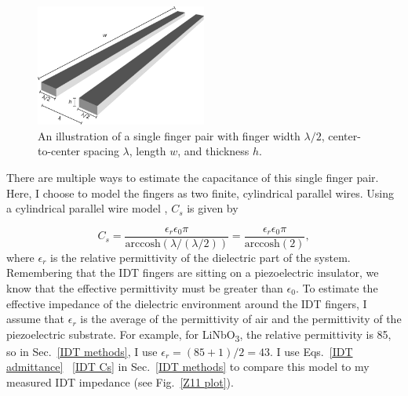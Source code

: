 \documentclass[double,12pt,1in,seploa]{beavtex}
\begin{document}
\begin{figure}
    \includegraphics[width = 0.5\textwidth]{IDT capacitance toy model_3d.pdf}
    \caption{An illustration of a single finger pair with finger width $\lambda/2$, center-to-center spacing $\lambda$, length $w$, and thickness $h$.}
    \label{IDT capacitance toy model}
\end{figure}
There are multiple ways to estimate the capacitance of this single finger pair. Here, I choose to model the fingers as two finite, cylindrical parallel wires. Using a cylindrical parallel wire model \cite[p. 682]{lonngren_fundamentals_2007}, $C_s$ is given by 

\begin{equation}
    C_s = \frac{\epsilon_r \epsilon_0 \pi}{\mathrm{arccosh}(\lambda/(\lambda/2))} = \frac{\epsilon_r \epsilon_0 \pi}{\mathrm{arccosh}(2)},
    \label{IDT Cs}
\end{equation}
where $\epsilon_r$ is the relative permittivity of the dielectric part of the system. Remembering that the IDT fingers are sitting on a piezoelectric insulator, we know that the effective permittivity must be greater than $\epsilon_0$. To estimate the effective impedance of the dielectric environment around the IDT fingers, I assume that $\epsilon_r$ is the average of the permittivity of air and the permittivity of the piezoelectric substrate. For example, for LiNbO\textsubscript{3}, the relative permittivity is 85, so in Sec.\ \ref{IDT methods}, I use $\epsilon_r = (85 + 1)/2 = 43$. I use Eqs.\ \ref{IDT admittance} \textendash\ \ref{IDT Cs} in Sec.\ \ref{IDT methods} to compare this model to my measured IDT impedance (see Fig.\ \ref{Z11 plot}).
\end{document}
